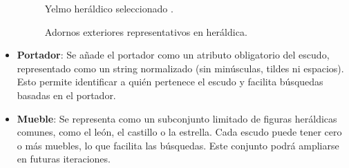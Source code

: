 \begin{itemize}
\begin{figure}[h!]
\begin{minipage}{0.3\textwidth}
        \caption{Yelmo heráldico seleccionado \cite{yelmo_wikipedia}.}
    \end{minipage}

    \caption{Adornos exteriores representativos en heráldica.}
    \label{fig:adornos_exteriores}
\end{figure}


    \item \textbf{Portador}: Se añade el portador como un atributo obligatorio del escudo, representado
    como un string normalizado (sin minúsculas, tildes ni espacios). Esto permite identificar a quién 
    pertenece el escudo y facilita búsquedas basadas en el portador.
    \item \textbf{Mueble}: Se representa como un subconjunto limitado de figuras heráldicas comunes,
    como el león, el castillo o la estrella. Cada escudo puede tener cero o más muebles, lo que facilita
    las búsquedas. Este conjunto podrá ampliarse en futuras iteraciones.

    \begin{figure}[h!]
        \centering


\end{figure}
\end{itemize}

